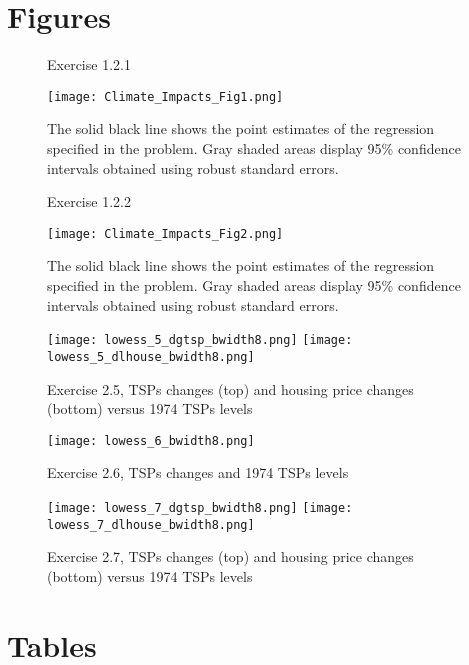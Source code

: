 \documentclass[12pt]{article}
\begin{document}
\clearpage


\section*{Figures}

\begin{figure}[h!]
\centering
\caption{Exercise 1.2.1}
\texttt{[image: Climate\_Impacts\_Fig1.png]}
\caption*{The solid black line shows the point estimates of the regression specified in the problem. Gray shaded areas display 95\% confidence intervals obtained using robust standard errors.}
\label{fig_climate_impacts_1}
\end{figure}


\begin{figure}[h!]
\centering
\caption{Exercise 1.2.2}
\texttt{[image: Climate\_Impacts\_Fig2.png]}
\caption*{The solid black line shows the point estimates of the regression specified in the problem. Gray shaded areas display 95\% confidence intervals obtained using robust standard errors.}
\label{fig_climate_impacts_2}
\end{figure}

\clearpage

\begin{figure}[h!]
\centering
\caption{Exercise 2.5, TSPs changes (top) and housing price changes (bottom) versus 1974 TSPs levels}
\texttt{[image: lowess\_5\_dgtsp\_bwidth8.png]}
\texttt{[image: lowess\_5\_dlhouse\_bwidth8.png]}
\label{fig_lowess5}
\end{figure}

\clearpage

\begin{figure}[h!]
\centering
\caption{Exercise 2.6, TSPs changes and 1974 TSPs levels}
\texttt{[image: lowess\_6\_bwidth8.png]}
\label{fig_lowess6}
\end{figure}

\clearpage

\begin{figure}[h!]
\centering
\caption{Exercise 2.7, TSPs changes (top) and housing price changes (bottom) versus 1974 TSPs levels}
\texttt{[image: lowess\_7\_dgtsp\_bwidth8.png]}
\texttt{[image: lowess\_7\_dlhouse\_bwidth8.png]}
\label{fig_lowess7}
\end{figure}


\clearpage

\section*{Tables}



\clearpage



\clearpage



\clearpage



\clearpage


\end{document}
